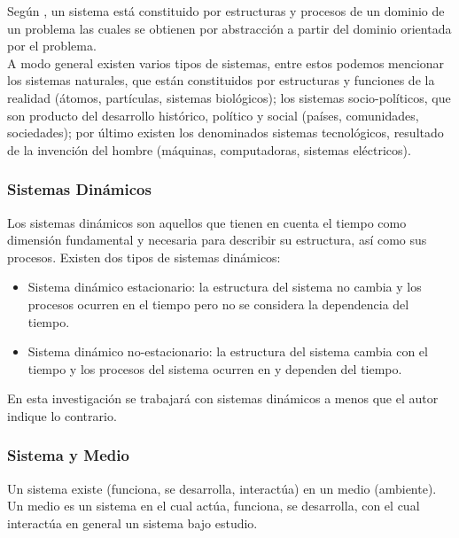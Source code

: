 Según  \parencite{temasdesimulacion}, un sistema está constituido por estructuras y procesos de un dominio de un problema las cuales se obtienen por abstracción a partir del dominio orientada por el problema.\\

A modo general existen varios tipos de sistemas, entre estos podemos mencionar los sistemas naturales, que están constituidos por estructuras y funciones de la realidad (átomos, partículas, sistemas biológicos); los sistemas socio-políticos, que son producto del desarrollo histórico, político y social (países, comunidades, sociedades); por último existen los denominados sistemas tecnológicos, resultado de la invención del hombre (máquinas, computadoras, sistemas eléctricos).\\

\subsubsection{Sistemas Dinámicos}

Los sistemas dinámicos son aquellos que tienen en cuenta el tiempo como dimensión fundamental y necesaria para describir su estructura, así como sus procesos. Existen dos tipos de sistemas dinámicos:
\begin{itemize}
	\item Sistema dinámico estacionario: la estructura del sistema no cambia y los procesos ocurren en el tiempo pero no se considera la dependencia del tiempo.
	\item Sistema dinámico no-estacionario: la estructura del sistema cambia con el tiempo y los procesos del sistema ocurren en y dependen del tiempo. \parencite{temasdesimulacion}
\end{itemize}

En esta investigación se trabajará con sistemas dinámicos a menos que el autor indique lo contrario.\\

\subsubsection{Sistema y Medio}

Un sistema existe (funciona, se desarrolla, interactúa) en un medio (ambiente). Un medio es un sistema en el cual actúa, funciona, se desarrolla, con el cual interactúa en general un sistema bajo estudio. \parencite{temasdesimulacion}\\


